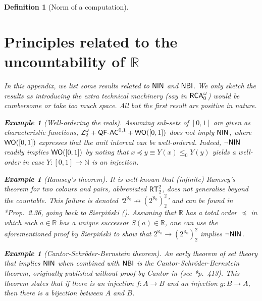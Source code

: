 \documentclass[reqno]{amsart}
\newtheorem{defi}[thm]{Definition}
\newtheorem{exa}[thm]{Example}
\def\Z{\textup{\textsf{Z}}}
\def\WO{\textup{\textsf{WO}}}
\def\RCAo{\textup{\textsf{RCA}}_{0}^{\omega}}
\def\N{{\mathbb  N}}
\def\R{{\mathbb  R}}
\def\di{\rightarrow}
\def\QFAC{\textup{\textsf{QF-AC}}}
\def\NBI{\textup{\textsf{NBI}}}
\def\NIN{\textup{\textsf{NIN}}}
\def\RT{\textup{\textsf{RT}}}
\numberwithin{equation}{section}
\numberwithin{thm}{section}
\begin{document}
\begin{defi}[Norm of a computation]
\section{Principles related to the uncountability of $\R$}\label{extraextrareadallaboutit}
In this appendix, we list some results related to $\NIN$ and $\NBI$.
We only sketch the results as introducing the extra technical machinery (say in $\RCAo$) would be cumbersome or take too much space. 
All but the first result are positive in nature.
\begin{exa}[Well-ordering the reals]\rm
Assuming sub-sets of $[0,1]$ are given as characteristic functions,  $\Z_{2}^{\omega}+\QFAC^{0,1}+\WO([0,1])$ does not imply $\NIN$, where $\WO([0,1])$ expresses that \emph{the unit interval can be well-ordered}.
Indeed, $\neg\NIN$ readily implies $\WO([0,1])$ by noting that $x\preceq y \equiv Y(x)\leq_{0}Y(y)$ yields a well-order in case $Y:[0,1]\di \N$ is an injection. 
\end{exa}
\begin{exa}[Ramsey's theorem]\rm
It is well-known that (infinite) Ramsey's theorem for two colours and pairs, abbreviated $\RT_{2}^{2}$, does not generalise beyond the countable.  
This failure is denoted `$2^{\aleph_{0}}\not\di (2^{\aleph_{0}})_{2}^{2}$' and can be found in \cite{reim}*{Prop.~2.36}, going back to Sierpi\'nski (\cite{grotesier2}).  
Assuming that $\R$ has a total order $\preceq$ in which each $a\in \R$ has a unique successor $S(a)\in \R$, one can use the aforementioned proof by Sierpi\'nski to show that $2^{\aleph_{0}}\di (2^{\aleph_{0}})_{2}^{2}$ implies $\neg\NIN$. 
\end{exa}
\begin{exa}[Cantor-Schr\"oder-Bernstein theorem]\label{CSB}\rm
An early theorem of set theory that implies $\NIN$ when combined with $\NBI$ is the \emph{Cantor-Schr\"oder-Bernstein theorem}, originally published without proof by Cantor in \cite{cantor3} (see \cite{cantor33}*{p.~413}).
This theorem states that if there is an injection $f:A\di B$ and an injection $g:B\di A$, then there is a bijection between $A$ and $B$.

\end{exa}
\end{defi}
\end{document}
